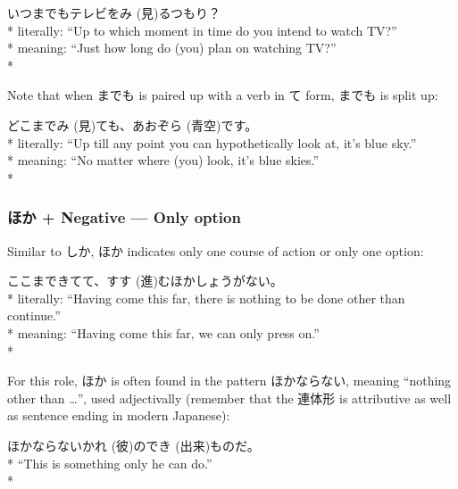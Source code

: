 \documentclass[11pt, b5paper, twoside, openright, onecolumn]{book}
\makeatletter
\newcommand*{\rubystack}[2]{{\relscale{0.5}%
  \begin{tabular}[b]{@{}c@{}}%
    {#1}\\%
   {\textscale{2}{#2}}%
  \end{tabular}}%
}
\DeclareRobustCommand*{\ruby}[2]{%
  \mbox{%
    \setlength{\parskip}{0ex}%
    \BeginAccSupp{method=pdfstringdef,ActualText={#1}}%
      \rubystack{\phantom{#2}}{#1}%
      \llap{%
        \rubystack{#2}{\phantom{#1}}%
      }%
    \EndAccSupp{}%
  }%
}
\renewcommand*{\ruby}[2]{#2 (#1)}%
\newenvironment{exampleblock}{
\setlength{\parindent}{0.6in}
\begin{minipage}[t]{\dimexpr\textwidth-\parindent}}
{\end{minipage}}
\makeatother
\begin{document}
\vspace{0.4cm}
\begin{exampleblock}
いつまでもテレビを\ruby{見}{み}るつもり？ \\* 
literally: “Up to which moment in time do you intend to watch TV?” \\* 
meaning: “Just how long do (you) plan on watching TV?” \\* 
\end{exampleblock}
\vspace{0.2cm}

Note that when までも is paired up with a verb in て form‚ までも is split up:

\vspace{0.4cm}
\begin{exampleblock}
どこまで\ruby{見}{み}ても、\ruby{青空}{あおぞら}です。 \\* 
literally: “Up till any point you can hypothetically look at‚ it’s blue sky.” \\* 
meaning: “No matter where (you) look‚ it’s blue skies.” \\* 
\end{exampleblock}
\subsubsection{ほか + Negative — Only option}


Similar to しか‚ ほか indicates only one course of action or only one option:

\vspace{0.4cm}
\begin{exampleblock}
ここまできてて、\ruby{進}{すす}むほかしょうがない。 \\* 
literally: “Having come this far‚ there is nothing to be done other than continue.” \\* 
meaning: “Having come this far‚ we can only press on.” \\* 
\end{exampleblock}
\vspace{0.2cm}

For this role‚ ほか is often found in the pattern ほかならない‚ meaning “nothing other than …”‚ used adjectivally (remember that the 連体形 is attributive as well as sentence ending in modern Japanese):

\vspace{0.4cm}
\begin{exampleblock}
ほかならない\ruby{彼}{かれ}の\ruby{出来}{でき}ものだ。 \\* 
“This is something only he can do.” \\* 
\end{exampleblock}
\end{document}
